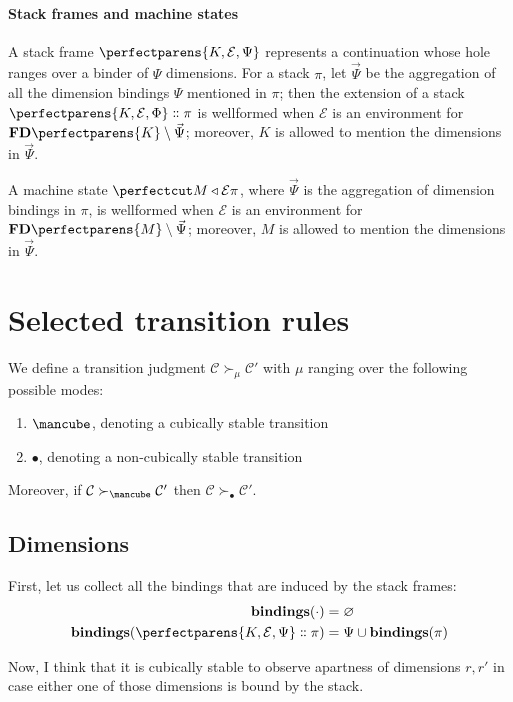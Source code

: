 \documentclass{article}
\newcommand\StackBindings[1]{\mathbf{bindings} (#1)}
\newcommand\Clo[2]{#1\triangleleft{#2}}
\newcommand\Cons[2]{{#1}\dblcolon{#2}}
\newcommand\FreeDims[1]{\mathbf{FD}\perfectparens{#1}}
\newcommand\Frame[3]{\perfectparens{#1,#2,#3}}
\newcommand\Cfg[3]{\cut{\Clo{#1}{#2}}{#3}}
\newcommand\Stable{\text{\mancube}}
\newcommand\NonStable{\bullet}
\newcommand\Step[3]{{#2}\mathrel{\succ_{#1}}{#3}}
\begin{document}
\paragraph{Stack frames and machine states}

A stack frame $\Frame{K}{\mathcal{E}}{\Psi}$ represents a continuation
whose hole ranges over a binder of $\Psi$ dimensions. For a stack
$\pi$, let $\vec{\Psi}$ be the aggregation of all the dimension
bindings $\Psi$ mentioned in $\pi$; then the extension of a stack
$\Cons{\Frame{K}{\mathcal{E}}{\Phi}}{\pi}$ is wellformed when
$\mathcal{E}$ is an environment for $\FreeDims{K}\setminus\vec{\Psi}$;
moreover, $K$ is allowed to mention the dimensions in $\vec{\Psi}$.

A machine state $\Cfg{M}{\mathcal{E}}{\pi}$, where $\vec{\Psi}$ is the
aggregation of dimension bindings in $\pi$, is wellformed when
$\mathcal{E}$ is an environment for $\FreeDims{M}\setminus\vec{\Psi}$;
moreover, $M$ is allowed to mention the dimensions in $\vec{\Psi}$.

\section{Selected transition rules}

We define a transition judgment
$\Step{\mu}{\mathcal{C}}{\mathcal{C}'}$ with $\mu$ ranging over
the following possible modes:
\begin{enumerate}
\item $\Stable$, denoting a cubically stable transition
\item $\NonStable$, denoting a non-cubically stable transition
\end{enumerate}

Moreover, if $\Step{\Stable}{\mathcal{C}}{\mathcal{C}'}$ then
$\Step{\NonStable}{\mathcal{C}}{\mathcal{C}'}$.

\subsection{Dimensions}

First, let us collect all the bindings that are induced by the stack
frames:
\begin{align*}
  \StackBindings{\cdot} &= \varnothing\\
  \StackBindings{\Cons{\Frame{K}{\mathcal{E}}{\Psi}}{\pi}} &= \Psi\cup\StackBindings{\pi}
\end{align*}

Now, I think that it is cubically stable to observe apartness of
dimensions $r,r'$ in case either one of those dimensions is bound by
the stack.
\end{document}
